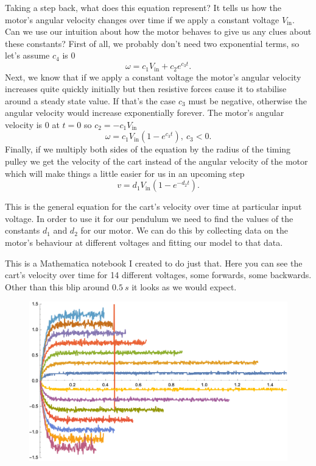 \documentclass{article}
\begin{document}
Taking a step back, what does this equation represent? It tells us how the motor's angular velocity changes over time if we apply a constant voltage $V_\text{in}$. Can we use our intuition about how the motor behaves to give us any clues about these constants? First of all, we probably don't need two exponential terms, so let's assume $c_4$ is $0$ \[\omega = c_1 V_\text{in} + c_2 e^{c_3 t}.\] Next, we know that if we apply a constant voltage the motor's angular velocity increases quite quickly initially but then resistive forces cause it to stabilise around a steady state value. If that's the case $c_3$ must be negative, otherwise the angular velocity would increase exponentially forever. The motor's angular velocity is $0$ at $t = 0$ so $c_2 = -c_1 V_\text{in}$ \[\omega = c_1 V_\text{in} (1 - e^{c_3 t}), \ c_3 < 0.\] Finally, if we multiply both sides of the equation by the radius of the timing pulley we get the velocity of the cart instead of the angular velocity of the motor which will make things a little easier for us in an upcoming step \[v = d_1 V_\text{in} (1 - e^{-d_2 t}).\]

This is the general equation for the cart's velocity over time at particular input voltage. In order to use it for our pendulum we need to find the values of the constants $d_1$ and $d_2$ for our motor. We can do this by collecting data on the motor's behaviour at different voltages and fitting our model to that data.

This is a Mathematica notebook I created to do just that. Here you can see the cart's velocity over time for 14 different voltages, some forwards, some backwards. Other than this blip around $\qty{0.5}{s}$ it looks as we would expect.

\begin{figure}[H]
  \centering
  \includegraphics[width=\textwidth]{angular_velocities}
\end{figure}
\end{document}
